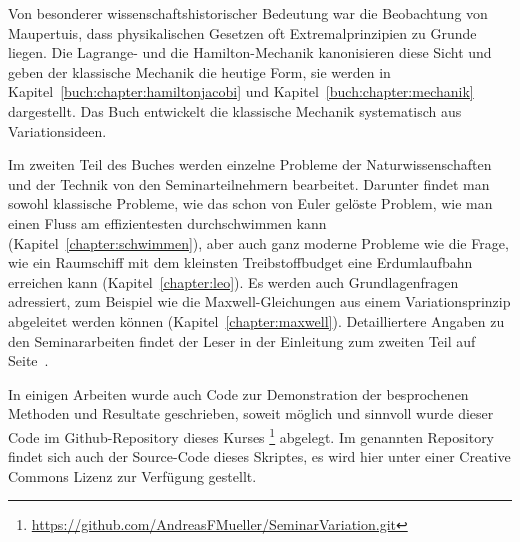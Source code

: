 Von besonderer wissenschaftshistorischer Bedeutung war die Beobachtung
von Maupertuis, dass physikalischen Gesetzen oft Extremalprinzipien zu
Grunde liegen.
Die La\-grange- und die Hamilton-Mechanik kanonisieren diese Sicht und geben
der klassische Mechanik die heutige Form, sie werden in
Kapitel~\ref{buch:chapter:hamiltonjacobi}
und
Kapitel~\ref{buch:chapter:mechanik}
dargestellt.
Das Buch \cite{buch:levi} entwickelt die klassische Mechanik systematisch
aus Variationsideen.

Im zweiten Teil des Buches werden einzelne Probleme der Naturwissenschaften
und der Technik von den Seminarteilnehmern bearbeitet.
Darunter findet man sowohl klassische Probleme, wie das schon von
Euler gelöste Problem, wie man einen Fluss am effizientesten durchschwimmen
kann (Kapitel~\ref{chapter:schwimmen}), aber auch ganz moderne Probleme
wie die Frage, wie ein Raumschiff mit dem kleinsten Treibstoffbudget
eine Erdumlaufbahn erreichen kann (Kapitel~\ref{chapter:leo}).
Es werden auch Grundlagenfragen adressiert, zum Beispiel wie
die Maxwell-Gleichungen aus einem Variationsprinzip abgeleitet werden
können (Kapitel~\ref{chapter:maxwell}).
Detailliertere Angaben zu den Seminararbeiten findet der Leser in der
Einleitung zum zweiten Teil auf Seite~\pageref{buch:part2:anwendungen}.

In einigen Arbeiten wurde auch Code zur Demonstration der 
besprochenen Methoden und Resultate geschrieben, soweit
möglich und sinnvoll wurde dieser Code im Github-Repository
%
dieses Kurses%
\footnote{\url{https://github.com/AndreasFMueller/SeminarVariation.git}}
\cite{buch:repo}
abgelegt.
Im genannten Repository findet sich auch der Source-Code dieses
Skriptes, es wird hier unter einer Creative Commons Lizenz
zur Verfügung gestellt.

